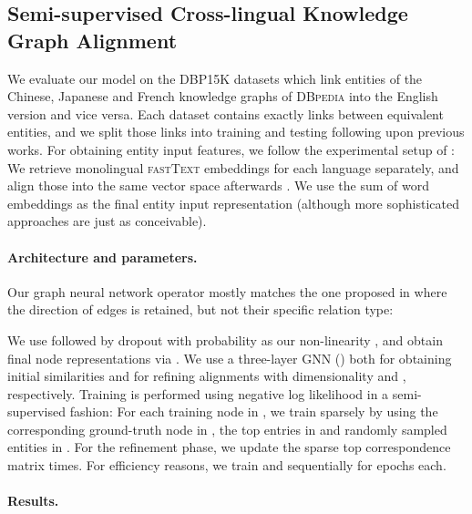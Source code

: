 \documentclass{article}
\begin{document}
\subsection{Semi-supervised Cross-lingual Knowledge Graph Alignment}\label{sub:semi-supervised_cross-lingual_knowledge_graph_alignment}

We evaluate our model on the \textsc{DBP15K} datasets \citep{Sun/etal/2017} which link entities of the Chinese, Japanese and French knowledge graphs of \textsc{DBpedia} into the English version and vice versa.
Each dataset contains exactly  links between equivalent entities, and we split those links into training and testing following upon previous works.
For obtaining entity input features, we follow the experimental setup of \citet{Xu/etal/2019a}: We retrieve monolingual \textsc{fastText} embeddings \citep{Bojanowski/etal/2017} for each language separately, and align those into the same vector space afterwards \citep{Lample/etal/2018}.
We use the sum of word embeddings as the final entity input representation (although more sophisticated approaches are just as conceivable).

\paragraph{Architecture and parameters.}

Our graph neural network operator mostly matches the one proposed in \citet{Xu/etal/2019a} where the direction of edges is retained, but not their specific relation type:

We use  followed by dropout with probability  as our non-linearity , and obtain final node representations via .
We use a three-layer GNN () both for obtaining initial similarities and for refining alignments with dimensionality  and , respectively.
Training is performed using negative log likelihood in a semi-supervised fashion: For each training node  in , we train  sparsely by using the corresponding ground-truth node in , the top  entries in  and  randomly sampled entities in .
For the refinement phase, we update the sparse top  correspondence matrix  times.
For efficiency reasons, we train  and  sequentially for  epochs each.

\paragraph{Results.}
\end{document}
